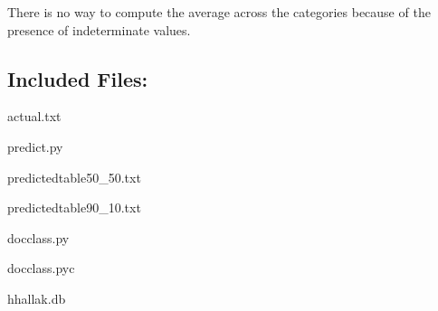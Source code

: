 \documentclass[a4paper, 11pt]{article}
\begin{document}
There is no way to compute the average across the categories because of the presence of indeterminate values.

\subsection*{Included Files:}

actual.txt

\noindent
predict.py

\noindent
predictedtable50\_50.txt

\noindent
predictedtable90\_10.txt

\noindent
docclass.py

\noindent
docclass.pyc

\noindent
hhallak.db
\end{document}
